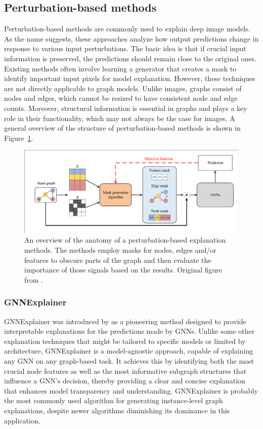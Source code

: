 \subsection{Perturbation-based methods}

Perturbation-based methods are commonly used to explain deep image models. As the name suggests, these approaches analyze how output predictions change in response to various input perturbations. The basic idea is that if crucial input information is preserved, the predictions should remain close to the original ones. Existing methods often involve learning a generator that creates a mask to identify important input pixels for model explanation. However, these techniques are not directly applicable to graph models. Unlike images, graphs consist of nodes and edges, which cannot be resized to have consistent node and edge counts. Moreover, structural information is essential in graphs and plays a key role in their functionality, which may not always be the case for images. A general overview of the structure of perturbation-based methods is shown in Figure~\ref{fig:perturbation-based-explainability}.

\begin{figure}
	\includegraphics[width=\linewidth]{images/perturbation-based-explainability.pdf}
	\caption{An overview of the anatomy of a perturbation-based explanation methods. The methods employ masks for nodes, edges and/or features to obscure parts of the graph and then evaluate the importance of those signals based on the results. Original figure from \cite{yuan_explainability_2022}.}
	\label{fig:perturbation-based-explainability}
\end{figure}

\subsubsection{GNNExplainer}

GNNExplainer was introduced by \cite{ying_gnnexplainer_2019} as a pioneering method designed to provide interpretable explanations for the predictions made by GNNs. Unlike some other explanation techniques that might be tailored to specific models or limited by architecture, GNNExplainer is a model-agnostic approach, capable of explaining any GNN on any graph-based task. It achieves this by identifying both the most crucial node features as well as the most informative subgraph structures that influence a GNN's decision, thereby providing a clear and concise explanation that enhances model transparency and understanding. GNNExplainer is probably the most commonly used algorithm for generating instance-level graph explanations, despite newer algorithms diminishing its dominance in this application.

